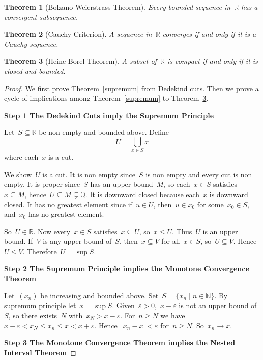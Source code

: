 \documentclass[12pt,a4paper,draft]{article}  %
\newtheorem{theorem}{Theorem}[section]
\theoremstyle{definition}
\numberwithin{equation}{section}
\newcommand{\RR}{\mathbb{R}}
\newcommand{\NN}{\mathbb{N}}
\begin{document}
\begin{theorem}[Bolzano Weierstrass Theorem]\label{bolzano}
Every bounded sequence in~$\RR$ has a convergent subsequence.
\end{theorem}

\begin{theorem}[Cauchy Criterion]\label{cauchy}
A sequence in~$\RR$ converges if and only if it is a Cauchy sequence.
\end{theorem}

\begin{theorem}[Heine Borel Theorem]\label{heine-borel}
A subset of~$\RR$ is compact if and only if it is closed and bounded.
\end{theorem}

\begin{proof}
We first prove Theorem~\ref{supremum} from Dedekind cuts.
Then we prove a cycle of implications among Theorem~\ref{supremum} to Theorem~\ref{heine-borel}.

\textbf{Step 1  The Dedekind Cuts imply the Supremum Principle}

Let~$S\subseteq\RR$ be non empty and bounded above.
Define
\[
U
=
\bigcup_{x\in S}x
\]
where each~$x$ is a cut.

We show~$U$ is a cut.
It is non empty since~$S$ is non empty and every cut is non empty.
It is proper since~$S$ has an upper bound~$M$, so each~$x\in S$ satisfies~$x\subseteq M$, hence~$U\subseteq M\subsetneq\mathbb{Q}$.
It is downward closed because each~$x$ is downward closed.
It has no greatest element since if~$u\in U$, then~$u\in x_0$ for some~$x_0\in S$, and~$x_0$ has no greatest element.

So~$U\in\RR$.
Now every~$x\in S$ satisfies~$x\subseteq U$, so~$x\le U$.
Thus~$U$ is an upper bound.
If~$V$ is any upper bound of~$S$, then~$x\subseteq V$ for all~$x\in S$, so~$U\subseteq V$.
Hence~$U\le V$.
Therefore~$U=\sup S$.

\textbf{Step 2  The Supremum Principle implies the Monotone Convergence Theorem}

Let~$(x_n)$ be increasing and bounded above.
Set~$S=\{x_n\mid n\in\NN\}$.
By supremum principle let~$x=\sup S$.
Given~$\varepsilon>0$,~$x-\varepsilon$ is not an upper bound of~$S$, so there exists~$N$ with~$x_N>x-\varepsilon$.
For~$n\ge N$ we have~$x-\varepsilon<x_N\le x_n\le x<x+\varepsilon$.
Hence~$|x_n-x|<\varepsilon$ for~$n\ge N$.
So~$x_n\to x$.

\textbf{Step 3  The Monotone Convergence Theorem implies the Nested Interval Theorem}


\end{proof}
\end{document}
